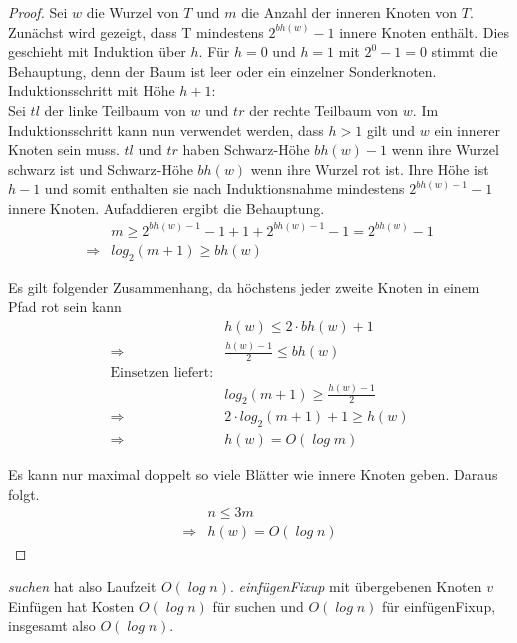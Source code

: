 \documentclass[a4paper,12pt]{article}
\begin{document}
\begin{proof}
	Sei $w$ die Wurzel von $T$ und $m$ die Anzahl der inneren Knoten von $T$. 
	Zunächst wird gezeigt, dass T mindestens $2^\mathit{bh(w)} - 1$ innere Knoten enthält.
	Dies geschieht mit Induktion über $h$. Für $h = 0$ und  $h = 1$ mit $2^0 - 1 = 0 $ stimmt die Behauptung, denn der Baum ist leer oder ein einzelner Sonderknoten.  
	Induktionsschritt mit Höhe $h + 1$:\\
	Sei $\mathit{tl}$ der linke Teilbaum von $w$ und $\mathit{tr}$ der rechte Teilbaum von $w$.  
	Im Induktionsschritt kann nun verwendet werden, dass $h > 1$ gilt und $w$ ein innerer Knoten sein muss. $\mathit{tl}$ und $\mathit{tr}$ haben Schwarz-Höhe $\mathit{bh(w)} - 1$ wenn ihre Wurzel schwarz ist und Schwarz-Höhe $\mathit{bh(w)}$ wenn ihre Wurzel rot ist. Ihre Höhe ist $h-1$ und somit enthalten sie nach Induktionsnahme mindestens  $2^\mathit{bh(w)- 1} - 1$ innere Knoten. Aufaddieren ergibt die Behauptung.\\    
	\begin{align*}
	&m \geq 2^\mathit{bh(w)- 1} - 1  + 1  + 2^\mathit{bh(w)- 1} - 1 = 2^\mathit{bh(w)} - 1\\
	\Rightarrow  &log_2(m + 1) \geq\mathit{bh(w)} 
	\end{align*}
	
	\noindent Es gilt folgender Zusammenhang, da höchstens jeder zweite Knoten in einem Pfad rot sein kann\\
	\begin{align*}
	&\mathit{h(w)} \leq 2 \cdot \mathit{bh(w) } + 1 \\
	\Rightarrow &\frac{\mathit{h(w)} - 1}{2} \leq\mathit{bh(w) } \\
	\text{Einsetzen liefert:}\\
	&log_2(m + 1) \geq\frac{\mathit{h(w)} - 1}{2} \\
	\Rightarrow	&2 \cdot log_2(m + 1) + 1 \geq\mathit{h(w)} \\
	\Rightarrow &\mathit{h(w)} = \mathit{O(\log {m})} 
	\end{align*}
	
	
	
	\noindent Es kann nur maximal doppelt so viele Blätter wie innere Knoten geben. Daraus folgt.
	\begin{align*}
	&n  \leq 3 m \\
	\Rightarrow &\mathit{h(w)} = \mathit{O(\log {n})} 
	\end{align*} 
	
	
\end{proof}
\noindent \textit{suchen} hat also Laufzeit $\mathit{O(\log {n})}$. \textit{einfügenFixup} mit übergebenen Knoten $v$ 
Einfügen hat  Kosten $\mathit{O(\log {n})}$ für suchen und  $\mathit{O(\log {n})}$ für einfügenFixup, insgesamt also  $\mathit{O(\log {n})}$. 
\end{document}
